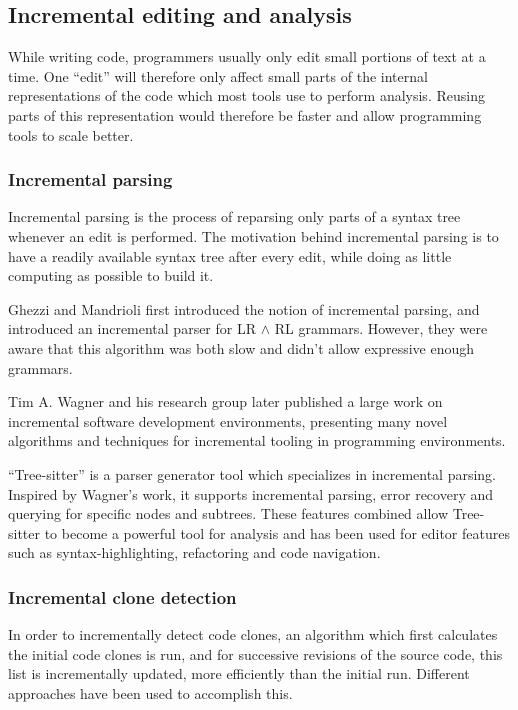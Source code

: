 \documentclass[12pt]{article}
\begin{document}
\subsection{Incremental editing and analysis}

While writing code, programmers usually only edit small portions of text at a time. One
``edit'' will therefore only affect small parts of the internal representations of the
code which most tools use to perform analysis. Reusing parts of this representation would
therefore be faster and allow programming tools to scale better.

\subsubsection{Incremental parsing}

Incremental parsing is the process of reparsing only parts of a syntax tree whenever an
edit is performed. The motivation behind incremental parsing is to have a readily
available syntax tree after every edit, while doing as little computing as possible to
build it.

Ghezzi and Mandrioli first introduced the notion of incremental parsing, and introduced an
incremental parser for LR $\land$ RL grammars. However, they were aware that this
algorithm was both slow and didn't allow expressive enough
grammars.\cite{incrementalparsing}

Tim A. Wagner\cite{PracticleAlgorithmsForIncremental} and his research group later
published a large work on incremental software development environments, presenting many
novel algorithms and techniques for incremental tooling in programming environments.

``Tree-sitter'' is a parser generator tool which specializes in incremental parsing.
Inspired by Wagner's work, it supports incremental parsing, error recovery and querying
for specific nodes and subtrees.\cite{treesitter} These features combined allow
Tree-sitter to become a powerful tool for analysis and has been used for editor features
such as syntax-highlighting, refactoring and code navigation.

\subsubsection{Incremental clone detection}

In order to incrementally detect code clones, an algorithm which first calculates the
initial code clones is run, and for successive revisions of the source code, this list is
incrementally updated, more efficiently than the initial run. Different approaches have
been used to accomplish this.
\end{document}
